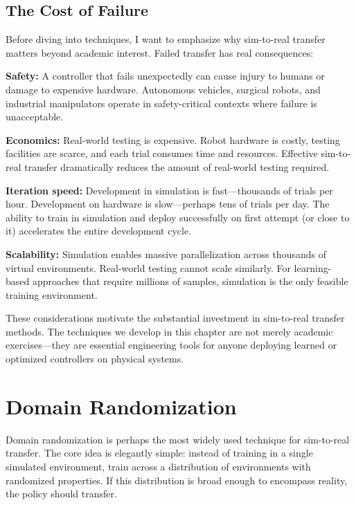 \subsection{The Cost of Failure}

Before diving into techniques, I want to emphasize why sim-to-real transfer matters beyond academic interest. Failed transfer has real consequences:

\textbf{Safety:} A controller that fails unexpectedly can cause injury to humans or damage to expensive hardware. Autonomous vehicles, surgical robots, and industrial manipulators operate in safety-critical contexts where failure is unacceptable.

\textbf{Economics:} Real-world testing is expensive. Robot hardware is costly, testing facilities are scarce, and each trial consumes time and resources. Effective sim-to-real transfer dramatically reduces the amount of real-world testing required.

\textbf{Iteration speed:} Development in simulation is fast---thousands of trials per hour. Development on hardware is slow---perhaps tens of trials per day. The ability to train in simulation and deploy successfully on first attempt (or close to it) accelerates the entire development cycle.

\textbf{Scalability:} Simulation enables massive parallelization across thousands of virtual environments. Real-world testing cannot scale similarly. For learning-based approaches that require millions of samples, simulation is the only feasible training environment.

These considerations motivate the substantial investment in sim-to-real transfer methods. The techniques we develop in this chapter are not merely academic exercises---they are essential engineering tools for anyone deploying learned or optimized controllers on physical systems.

\section{Domain Randomization}
\label{sec:domain_randomization}

Domain randomization is perhaps the most widely used technique for sim-to-real transfer. The core idea is elegantly simple: instead of training in a single simulated environment, train across a distribution of environments with randomized properties. If this distribution is broad enough to encompass reality, the policy should transfer.

